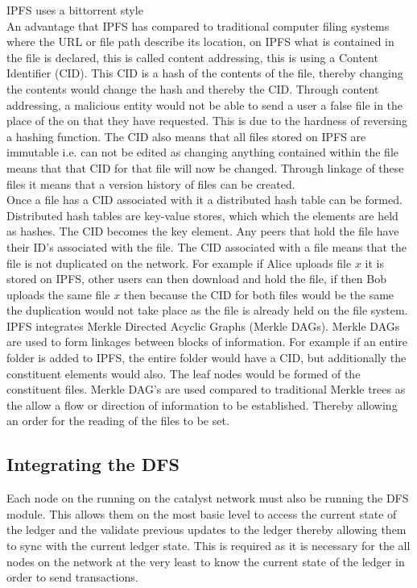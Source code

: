 \documentclass{article}
\begin{document}
IPFS uses a bittorrent style \\

An advantage that IPFS has compared to traditional computer filing systems where the URL or file path describe its location, on IPFS what is contained in the file is declared, this is called content addressing, this is using a Content Identifier (CID). This CID is a hash of the contents of the file, thereby changing the contents would change the hash and thereby the CID. Through content addressing, a malicious entity would not be able to send a user a false file in the place of the on that they have requested. This is due to the hardness of reversing a hashing function. The CID also means that all files stored on IPFS are immutable i.e. can not be edited as changing anything contained within the file means that that CID for that file will now be changed. Through linkage of these files it means that a version history of files can be created. \\

Once a file has a CID associated with it a distributed hash table can be formed. Distributed hash tables are key-value stores, which which the elements are held as hashes. The CID becomes the key element. Any peers that hold the file have their ID's associated with the file. The CID associated with a file means that the file is not duplicated on the network. For example if Alice uploads file $x$ it is stored on IPFS, other users can then download and hold the file, if then Bob uploads the same file $x$ then because the CID for both files would be the same the duplication would not take place as the file is already held on the file system.  \\

IPFS integrates Merkle Directed Acyclic Graphs (Merkle DAGs). Merkle DAGs are used to form linkages between blocks of information. For example if an entire folder is added to IPFS, the entire folder would have a CID, but additionally the constituent elements would also. The leaf nodes would be formed of the constituent files. Merkle DAG's are used compared to traditional Merkle trees as the allow a flow or direction of information to be established. Thereby allowing an order for the reading of the files to be set. 


\subsection{Integrating the DFS}

Each node on the running on the catalyst network must also be running the DFS module. This allows them on the most basic level to access the current state of the ledger and the validate previous updates to the ledger thereby allowing them to sync with the current ledger state. This is required as it is necessary for the all nodes on the network at the very least to know the current state of the ledger in order to send transactions. \\
\end{document}
